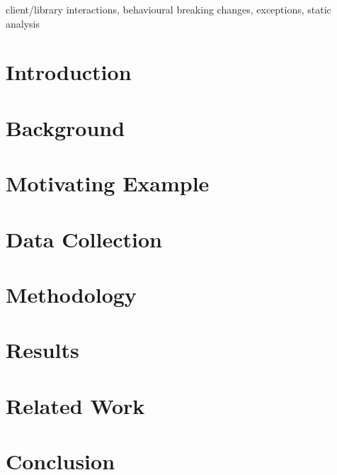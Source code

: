 \documentclass[conference]{IEEEtran}
\begin{document}
    

    \begin{IEEEkeywords}
        client/library interactions, behavioural breaking changes, exceptions, static analysis
    \end{IEEEkeywords}


    \section{Introduction} \label{sec:introduction}
    

    \section{Background}\label{sec:background}
    


    \section{Motivating Example} \label{sec:motivating}
    

    \section{Data Collection}\label{sec:data-collection}
    


    \section{Methodology}\label{sec:methodology}
    


    \section{Results}\label{sec:results}
    



    
    \section{Related Work}\label{sec:related-work}
    
    

    \section{Conclusion}\label{sec:conclusion-&-future-work}
    
    
    
\end{document}
